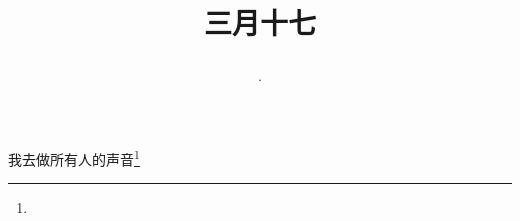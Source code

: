 \title{\date[d=25,m=4,y=2024][year:cn-y,年,month:cn,day:cn,日,·,weekday]·三月十七 }
我去做所有人的声音\footnote{ }

